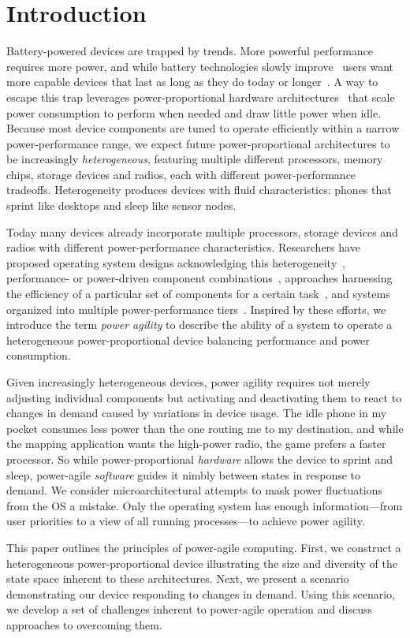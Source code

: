 \section{Introduction}

Battery-powered devices are trapped by trends. More powerful performance
requires more power, and while battery technologies slowly
improve~\cite{economist-batteryhistory} users want more capable devices that
last as long as they do today or longer~\cite{informationweek-batteries}. A
way to escape this trap leverages power-proportional hardware
architectures~\cite{barroso-energyproportional} that scale power consumption
to perform when needed and draw little power when idle. Because most device
components are tuned to operate efficiently within a narrow power-performance
range, we expect future power-proportional architectures to be increasingly
\textit{heterogeneous}, featuring multiple different processors, memory
chips, storage devices and radios, each with different power-performance
tradeoffs. Heterogeneity produces devices with fluid characteristics: phones
that sprint like desktops and sleep like sensor nodes.

Today many devices already incorporate multiple processors, storage devices
and radios with different power-performance characteristics. Researchers have
proposed operating system designs acknowledging this
heterogeneity~\cite{baumann-barrelfish}, performance- or power-driven
component combinations~\cite{mogul-hybridnvmdram,aruna-3Gwifi}, approaches
harnessing the efficiency of a particular set of components for a certain
task~\cite{andersen-fawn,szalay-amdahl}, and systems organized into multiple
power-performance tiers~\cite{sorber-turducken}. Inspired by these efforts,
we introduce the term \textit{power agility} to describe the ability of a
system to operate a heterogeneous power-proportional device balancing
performance and power consumption.

Given increasingly heterogeneous devices, power agility requires not merely
adjusting individual components but activating and deactivating them to react
to changes in demand caused by variations in device usage. The idle phone in
my pocket consumes less power than the one routing me to my destination, and
while the mapping application wants the high-power radio, the game prefers a
faster processor. So while power-proportional \textit{hardware} allows the
device to sprint and sleep, power-agile \textit{software} guides it nimbly
between states in response to demand. We consider microarchitectural attempts
to mask power fluctuations~\cite{rangan-hpca11} from the OS a mistake. Only
the operating system has enough information---from user priorities to a view
of all running processes---to achieve power agility.

This paper outlines the principles of power-agile computing. First, we
construct a heterogeneous power-proportional device illustrating the size and
diversity of the state space inherent to these architectures. Next, we
present a scenario demonstrating our device responding to changes in demand.
Using this scenario, we develop a set of challenges inherent to power-agile
operation and discuss approaches to overcoming them.
